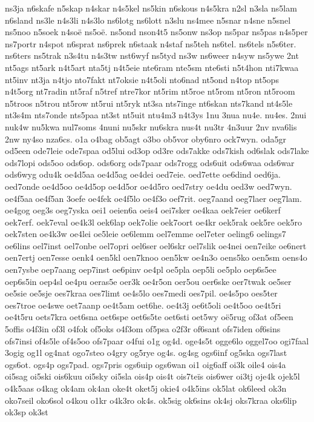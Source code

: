 ns3ja
n6skafe
n5skap
n4skar
n4s5kel
ns5kin
n6skous
n4s5kra
n2sl
n3sla
ns5lam
n6sland
ns3le
n4s3li
n4s3lo
ns6lotg
ns6lott
n3slu
ns4mee
n5snar
n4sne
n5snel
ns5noo
n5soek
n4soë
ns5oë.
ns5ond
nson4t5
ns5onw
ns3op
ns5par
ns5pas
n4s5per
ns7portr
n4spot
n6sprat
ns6prek
n6staak
n4staf
ns5teh
ns6tel.
ns6tels
n5s6ter.
ns6ters
ns5trak
n3s4tu
n4s3tw
nst6wyf
ns5tyd
ns3w
ns6weer
n4syw
ns5ywe
2nt
nt5ags
nt5ark
n4t5art
nta5tj
n4t5eie
nte6ram
nte5sm
nte6sti
n5t4hon
nti7kwaa
nt5inv
nt3ja
n4tjo
nto7fakt
nt7oksie
n4t5oli
nto6nad
nt5ond
n4top
nt5ops
n4t5org
nt7radin
nt5raf
n5tref
ntre7kor
nt5rim
nt5roe
nt5rom
nt5ron
nt5room
n5troos
n5trou
nt5row
nt5rui
nt5ryk
nt3sa
nts7inge
nt6skan
nts7kand
nt4s5le
nt3s4m
nts7onde
nts5paa
nt3st
nt5uit
ntu4m3
n4t3ys
1nu
3nua
nu4e.
nu4es.
2nui
nuk4w
nu5kwa
nul7soms
4nuni
nu5skr
nu6skra
nus4t
nu3tr
4n3uur
2nv
nva6lis
2nw
ny4so
nza6cs.
o1a
o4bag
ob5agt
o3bo
ob5vor
oby6nro
ock7wyn.
oda5gr
od5een
ode7leie
ode7spaa
od5lui
od3op
od3re
ods7akke
ods7kish
od6slak
ods7lake
ods7lopi
ods5oo
ods6op.
ods6org
ods7paar
ods7rogg
ods6uit
ods6waa
ods6war
ods6wyg
odu4k
oe4d5aa
oe4d5ag
oe4dei
oed7eie.
oed7ette
oe6dind
oed6ja.
oed7onde
oe4d5oo
oe4d5op
oe4d5or
oe4d5ro
oed7stry
oe4du
oed3w
oed7wyn.
oe4f5aa
oe4f5an
3oefe
oe4fek
oe4f5lo
oe4f3o
oef7rit.
oeg7aand
oeg7laer
oeg7lam.
oe4gog
oeg3s
oeg7yska
oei1
oeien6a
oeis4
oei7sker
oe4kaa
oek7eier
oe6kerf
oek7erf.
oek7eval
oe4k3l
oek6lap
oek7olie
oek7oort
oe4kr
oek5rak
oek5re
oek5ro
oek7sten
oe4k3w
oe4lei
oe5leie
oe6lemm
oel7emme
oel7eter
oeling6
oelings7
oe6lins
oel7inst
oel7onbe
oel7opri
oel6ser
oel6skr
oel7slik
oe4nei
oen7eike
oe6nert
oen7ertj
oen7esse
oenk4
oen5kl
oen7knoo
oen5kw
oe4n3o
oens5ko
oen5sm
oens4o
oen7ysbe
oep7aang
oep7inst
oe6pinv
oe4pl
oe5pla
oep5li
oe5plo
oep6s5ee
oep6s5in
oep4sl
oe4pu
oeras5e
oer3k
oe4r5on
oer5ou
oer6ske
oer7twak
oe5ser
oe5sie
oe5sje
oes7kraa
oes7limt
oe4s5lo
oes7medi
oes7pil.
oe4s5po
oes5ter
oes7troe
oe4swe
oet7aanp
oe4t5am
oet6he.
oe4t3j
oe6t5oli
oe4t5oo
oe4t5ri
oe4t5ru
oets7kra
oet6sna
oet6spe
oet6s5te
oet6sti
oet5wy
oë5rug
of3at
of5een
5offis
o4f3in
of3l
o4fok
of5oks
o4f3om
of5psa
o2f3r
of6sant
ofs7iden
of6sins
ofs7insi
of4s5le
of4s5oo
ofs7paar
o4fui
o1g
og4d.
oge4s5t
ogge6lo
oggel7oo
ogi7faal
3ogig
og1l
og4nat
ogo7steo
o4gry
og5rye
og4s.
og4sg
ogs6inf
og5ska
ogs7last
ogs6ot.
ogs4p
ogs7pad.
ogs7pris
ogs6uip
ogs6wan
oi1
oig6aff
oi3k
oile4
ois4a
oi5sag
oi5ski
ois6kuu
oi5sky
oi5sla
ois4p
ois4t
ois7teïs
ois6wer
oi3tj
oje4k
ojek5l
o4k5aas
o4kag
ok4am
ok4an
oke4t
oket5j
okie4
o4k5ins
ok5lat
ok6leed
ok3n
oko7seil
oko6sol
o4kou
o1kr
o4k3ro
ok4s.
ok5sig
ok6sins
ok4sj
oks7kraa
oks6lip
ok3sp
ok3st
